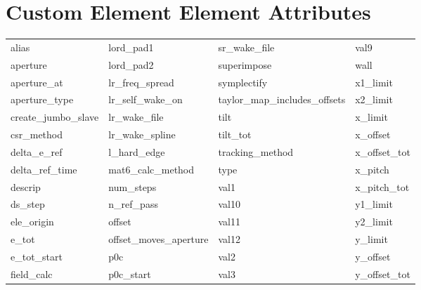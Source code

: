  \section{Custom Element Element Attributes}
 \label{s:list.custom}
 
 \begin{tabular}{llll} \toprule
alias                       & lord_pad1                   & sr_wake_file                & val9                        \\
aperture                    & lord_pad2                   & superimpose                 & wall                        \\
aperture_at                 & lr_freq_spread              & symplectify                 & x1_limit                    \\
aperture_type               & lr_self_wake_on             & taylor_map_includes_offsets & x2_limit                    \\
create_jumbo_slave          & lr_wake_file                & tilt                        & x_limit                     \\
csr_method                  & lr_wake_spline              & tilt_tot                    & x_offset                    \\
delta_e_ref                 & l_hard_edge                 & tracking_method             & x_offset_tot                \\
delta_ref_time              & mat6_calc_method            & type                        & x_pitch                     \\
descrip                     & num_steps                   & val1                        & x_pitch_tot                 \\
ds_step                     & n_ref_pass                  & val10                       & y1_limit                    \\
ele_origin                  & offset                      & val11                       & y2_limit                    \\
e_tot                       & offset_moves_aperture       & val12                       & y_limit                     \\
e_tot_start                 & p0c                         & val2                        & y_offset                    \\
field_calc                  & p0c_start                   & val3                        & y_offset_tot                \\

\end{tabular}
